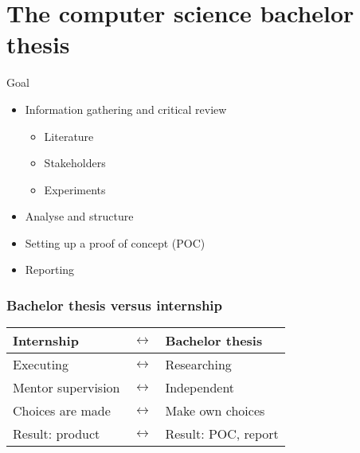 \documentclass[aspectratio=169]{beamer}
\begin{document}
    \section{The  computer science bachelor thesis}
    
    \begin{frame}{Goal}
        
        
        \begin{itemize}
            \item Information gathering and critical review
            \begin{itemize}
                \item Literature
                \item Stakeholders
                \item Experiments
            \end{itemize}
            \item Analyse and structure
            \item Setting up a proof of concept (POC)
            \item Reporting
        \end{itemize}
        
    \end{frame}
    
    \begin{frame}
        \frametitle{Bachelor thesis versus internship}
        
        \centering
        \begin{tabular}{lcl}
            \toprule
            \textbf{Internship}               & $\leftrightarrow$ & \textbf{Bachelor thesis}        \\
            \midrule
            Executing                   & $\leftrightarrow$ & Researching                  \\
            Mentor supervision          & $\leftrightarrow$ & Independent \\
            Choices are made          & $\leftrightarrow$ & Make own choices \\
            Result: product & $\leftrightarrow$ & Result: POC, report       \\
            \bottomrule
        \end{tabular}
    \end{frame}
    
\end{document}
